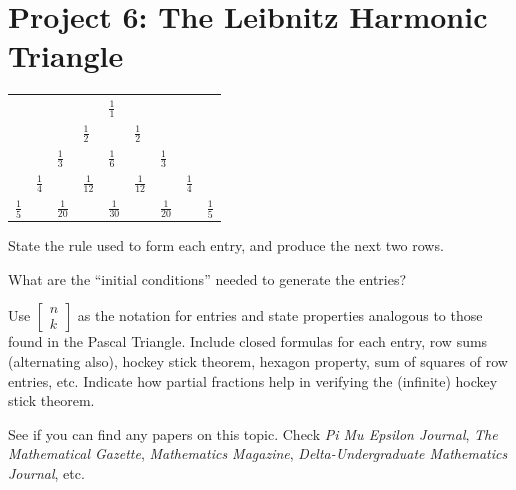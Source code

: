 \documentclass[10pt,]{book}
\theoremstyle{plain}
\theoremstyle{definition}
\theoremstyle{definition}
\theoremstyle{definition}
\theoremstyle{definition}
\numberwithin{equation}{chapter}
\begin{document}
\section[{Project 6: The Leibnitz Harmonic Triangle}]{Project 6: The Leibnitz Harmonic Triangle}\label{exercises-16}
\begin{sidebyside}{1}{0}{0}{0}
\begin{sbspanel}{1}
{\centering%
\begin{tabular}{lllllllll}
&&&&\(\frac{1}{1}\)&&&&\tabularnewline[0pt]
&&&\(\frac{1}{2}\)&&\(\frac{1}{2}\)&&&\tabularnewline[0pt]
&&\(\frac{1}{3}\)&&\(\frac{1}{6}\)&&\(\frac{1}{3}\)&&\tabularnewline[0pt]
&\(\frac{1}{4}\)&&\(\frac{1}{12}\)&&\(\frac{1}{12}\)&&\(\frac{1}{4}\)&\tabularnewline[0pt]
\(\frac{1}{5}\)&&\(\frac{1}{20}\)&&\(\frac{1}{30}\)&&\(\frac{1}{20}\)&&\(\frac{1}{5}\)
\end{tabular}
\par}
\end{sbspanel}
\end{sidebyside}
\begin{divisionexercise}{1}\hypertarget{exercise-167}{}
\hypertarget{p-1336}{}%
State the rule used to form each entry, and produce the next two rows.%
\end{divisionexercise}%
\begin{divisionexercise}{2}\hypertarget{exercise-168}{}
\hypertarget{p-1337}{}%
What are the ``initial conditions'' needed to generate the entries?%
\end{divisionexercise}%
\begin{divisionexercise}{3}\hypertarget{exercise-169}{}
\hypertarget{p-1338}{}%
Use \(\begin{bmatrix} n\\ k \end{bmatrix}\) as the notation for entries and state properties analogous to those found in the Pascal Triangle. Include closed formulas for each entry, row sums (alternating also), hockey stick theorem, hexagon property, sum of squares of row entries, etc. Indicate how partial fractions help in verifying the (infinite) hockey stick theorem.%
\end{divisionexercise}%
\begin{divisionexercise}{4}\hypertarget{exercise-170}{}
\hypertarget{p-1339}{}%
See if you can find any papers on this topic. Check \emph{Pi Mu Epsilon Journal}, \emph{The Mathematical Gazette}, \emph{Mathematics Magazine}, \emph{Delta-Undergraduate Mathematics Journal}, etc.%
\end{divisionexercise}%
\typeout{************************************************}
\typeout{************************************************}
\end{document}
